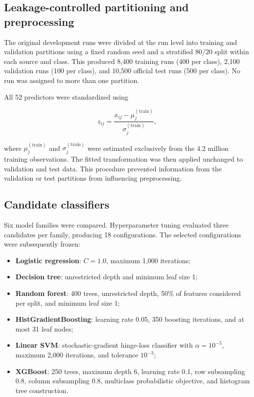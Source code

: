 \documentclass[10pt,twocolumn,a4paper]{article}
\begin{document}
\subsection{Leakage-controlled partitioning and preprocessing}
\label{sec:split}

The original development runs were divided at the run level into training and
validation partitions using a fixed random seed and a stratified 80/20 split
within each source and class. This produced 8,400 training runs (400 per class),
2,100 validation runs (100 per class), and 10,500 official test runs (500 per
class). No run was assigned to more than one partition.

All 52 predictors were standardized using

\begin{equation}
z_{ij}=\frac{x_{ij}-\mu_j^{(\mathrm{train})}}
{\sigma_j^{(\mathrm{train})}},
\end{equation}

\noindent where $\mu_j^{(\mathrm{train})}$ and $\sigma_j^{(\mathrm{train})}$ were
estimated exclusively from the 4.2 million training observations. The fitted
transformation was then applied unchanged to validation and test data. This
procedure prevented information from the validation or test partitions from
influencing preprocessing.

\subsection{Candidate classifiers}
\label{sec:candidates}

Six model families were compared. Hyperparameter tuning evaluated three
candidates per family, producing 18 configurations. The selected configurations
were subsequently frozen:

\begin{itemize}
  \item \textbf{Logistic regression}: $C=1.0$, maximum 1,000 iterations;
  \item \textbf{Decision tree}: unrestricted depth and minimum leaf size 1;
  \item \textbf{Random forest}: 400 trees, unrestricted depth, 50\% of features
  considered per split, and minimum leaf size 1;
  \item \textbf{HistGradientBoosting}: learning rate 0.05, 350 boosting
  iterations, and at most 31 leaf nodes;
  \item \textbf{Linear SVM}: stochastic-gradient hinge-loss classifier with
  $\alpha=10^{-5}$, maximum 2,000 iterations, and tolerance $10^{-3}$;
  \item \textbf{XGBoost}: 250 trees, maximum depth 6, learning rate 0.1,
  row subsampling 0.8, column subsampling 0.8, multiclass probabilistic
  objective, and histogram tree construction.
\end{itemize}
\end{document}

